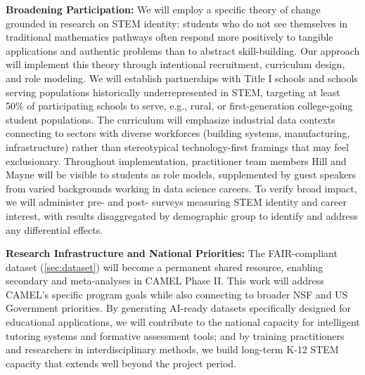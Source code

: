 \documentclass[11pt]{article}
\begin{document}
\textbf{Broadening Participation:}
We will employ a specific theory of change grounded in research on STEM identity: students who do not see themselves in traditional mathematics pathways often respond more positively to tangible applications and authentic problems than to abstract skill-building.
Our approach will implement this theory through intentional recruitment, curriculum design, and role modeling.
We will establish partnerships with Title I schools and schools serving populations historically underrepresented in STEM, targeting at least 50\% of participating schools to serve, e.g., rural, or first-generation college-going student populations.
The curriculum will emphasize industrial data contexts connecting to sectors with diverse workforces (building systems, manufacturing, infrastructure) rather than stereotypical technology-first framings that may feel exclusionary. 
Throughout implementation, practitioner team members Hill and Mayne will be visible to students as role models, supplemented by guest speakers from varied backgrounds working in data science careers.
To verify broad impact, we will administer pre- and post- surveys measuring STEM identity and career interest, with results disaggregated by demographic group to identify and address any differential effects.

\textbf{Research Infrastructure and National Priorities:}
The FAIR-compliant dataset (\autoref{sec:dataset}) will become a permanent shared resource, enabling secondary and meta-analyses in CAMEL Phase II.
This work will address CAMEL's specific program goals while also connecting to broader NSF and US Government priorities.
By generating AI-ready datasets specifically designed for educational applications, we will contribute to the national capacity for intelligent tutoring systems and formative assessment tools; and
by training practitioners and researchers in interdisciplinary methods, we build long-term K-12 STEM capacity that extends well beyond the project period.
\end{document}
